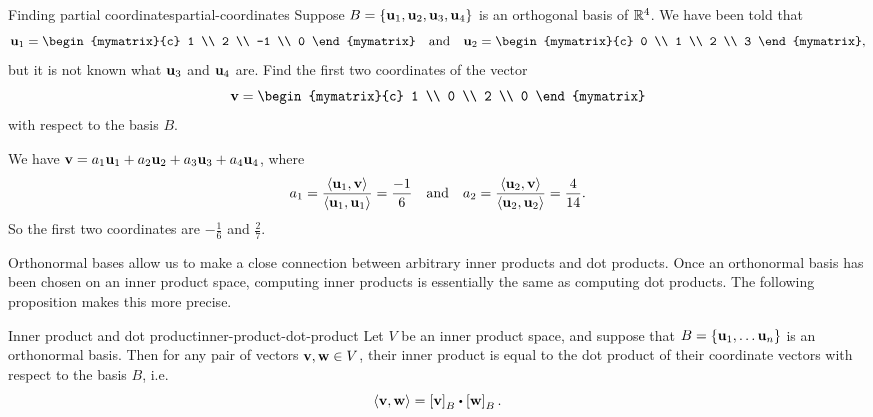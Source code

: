\begin{example}{Finding partial coordinates}{partial-coordinates}
  Suppose $B=\set{\vect{u}_1,\vect{u}_2,\vect{u}_3,\vect{u}_4}$ is an
  orthogonal basis of $\mathbb{R}^4$. We have been told that
  \begin{equation*}
    \vect{u}_1 = \begin{mymatrix}{c} 1 \\ 2 \\ -1 \\ 0 \end{mymatrix}
    \quad\mbox{and}\quad
    \vect{u}_2 = \begin{mymatrix}{c} 0 \\ 1 \\ 2 \\ 3 \end{mymatrix},
  \end{equation*}
  but it is not known what $\vect{u}_3$ and $\vect{u}_4$ are. Find the
  first two coordinates of the vector
  \begin{equation*}
    \vect{v} = \begin{mymatrix}{c} 1 \\ 0 \\ 2 \\ 0 \end{mymatrix}
  \end{equation*}
  with respect to the basis $B$.
\end{example}

\begin{solution}
  We have $\vect{v} = a_1\vect{u}_1 + a_2\vect{u}_2 + a_3\vect{u}_3 +
  a_4\vect{u}_4$, where
  \begin{equation*}
    a_1
    = \frac{\iprod{\vect{u}_1,\vect{v}}}{\iprod{\vect{u}_1,\vect{u}_1}}
    = \frac{-1}{6}
    \quad\mbox{and}\quad
    a_2
    = \frac{\iprod{\vect{u}_2,\vect{v}}}{\iprod{\vect{u}_2,\vect{u}_2}}
    = \frac{4}{14}.
  \end{equation*}
  So the first two coordinates are $-\frac{1}{6}$ and $\frac{2}{7}$.
\end{solution}

Orthonormal bases allow us to make a close connection between
arbitrary inner products and dot products. Once an orthonormal basis
has been chosen on an inner product space, computing inner products is
essentially the same as computing dot products. The following
proposition makes this more precise.

\begin{proposition}{Inner product and dot product}{inner-product-dot-product}
  Let $V$ be an inner product space, and suppose that
  $B=\set{\vect{u}_1,\ldots\vect{u}_n}$ is an orthonormal basis. Then
  for any pair of vectors $\vect{v},\vect{w}\in V$, their inner
  product is equal to the dot product of their coordinate vectors with
  respect to the basis $B$, i.e.
  \begin{equation*}
    \iprod{\vect{v},\vect{w}}
    = \coord{\vect{v}}_B \dotprod \coord{\vect{w}}_B.
  \end{equation*}
\end{proposition}

